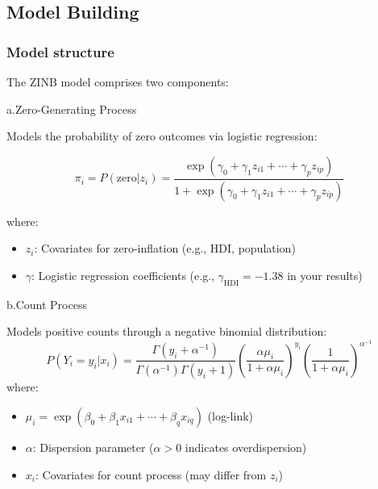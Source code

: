 \documentclass[11pt,twoside]{article}
\numberwithin{Theorem}{section}
\numberwithin{Definition}{section}
\numberwithin{Lemma}{section}
\numberwithin{Algorithm}{section}
\numberwithin{equation}{section}
\begin{document}
\subsection{Model Building}
\subsubsection{Model structure}

The ZINB model comprises two components:

a.Zero-Generating Process

Models the probability of zero outcomes via logistic regression:


\begin{equation}
\pi_i = P(\text{zero}|z_i) = \frac{\exp(\gamma_0 + \gamma_1 z_{i1} + \cdots + \gamma_p z_{ip})}{1 + \exp(\gamma_0 + \gamma_1 z_{i1} + \cdots + \gamma_p z_{ip})}
\end{equation}


where:
\begin{itemize}
    \item $z_i$: Covariates for zero-inflation (e.g., HDI, population)
    \item $\gamma$: Logistic regression coefficients (e.g., $\gamma_{\text{HDI}} = -1.38$ in your results)
\end{itemize}

b.Count Process

Models positive counts through a negative binomial distribution:
\begin{equation}
P(Y_i = y_i|x_i) = \frac{\Gamma(y_i + \alpha^{-1})}{\Gamma(\alpha^{-1})\Gamma(y_i+1)} \left( \frac{\alpha\mu_i}{1+\alpha\mu_i} \right)^{y_i} \left( \frac{1}{1+\alpha\mu_i} \right)^{\alpha^{-1}}
\end{equation}
where:
\begin{itemize}
    \item $\mu_i = \exp(\beta_0 + \beta_1 x_{i1} + \cdots + \beta_q x_{iq})$ (log-link)
    \item $\alpha$: Dispersion parameter ($\alpha>0$ indicates overdispersion)
    \item $x_i$: Covariates for count process (may differ from $z_i$)
\end{itemize}
\end{document}
